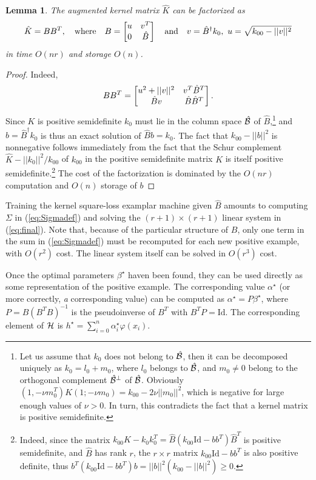 \documentclass[12pt,letterpaper]{article}
\newtheorem{lemma}{Lemma}
\begin{document}
\begin{lemma}
The augmented kernel matrix $\hat{K}$ can be factorized as
\begin{equation}
\hat{K}=BB^T,\quad\text{where}\quad
B=\left[\begin{matrix}u & v^T\\0 & \hat{B}\end{matrix}\right]\quad\text{and}\quad
v=\hat{B}^\dagger k_0,\,\, u=\sqrt{k_{00}-||v||^2}
\end{equation}
in time $O(nr)$ and storage $O(n)$.
\end{lemma}
\begin{proof}
Indeed,
\begin{equation}
BB^T=\left[\begin{matrix}u^2+||v||^2 & v^T\hat{B}^T\\ \hat{B}v & \hat{B}\hat{B}^T\end{matrix}\right].
\end{equation}
Since $K$ is positive semidefinite $k_0$ must lie in the column space
$\cal \hat{B}$ of $\hat{B}$,\footnote{Let
us assume that $k_0$ does not belong to $\cal \hat{B}$, then it can be
decomposed uniquely as $k_0=l_0+m_0$, where $l_0$ belongs to $\cal \hat{B}$,
and $m_0\neq 0$ belong to the orthogonal complement $\cal \hat{B}^\perp$ of
$\cal \hat{B}$. Obviously $(1,-\nu m_0^T)K(1;-\nu m_0)=k_{00}-2\nu||m_0||^2$, which
is negative for large enough values of $\nu>0$. In turn, this contradicts the
fact that a kernel matrix is positive semidefinite.}
and $b=\hat{B}^\dagger k_0$ is thus an exact solution of
$\hat{B}b=k_0$.
The fact that $k_{00}-||b||^2$ is nonnegative follows immediately from
the fact that the Schur complement $\hat{K}-||k_0||^2/k_{00}$ of $k_{00}$ in
the positive semidefinite matrix $K$ is itself positive semidefinite.\footnote{Indeed,
since the matrix $k_{00}K-k_0k_0^T=\hat{B}(k_{00}\text{Id}-bb^T)\hat{B}^T$ is
positive semidefinite, and $\hat{B}$ has rank $r$, the $r\times r$ matrix
$k_{00}\text{Id}-bb^T$
is also positive definite, thus
$b^T(k_{00}\text{Id}-bb^T)b=||b||^2(k_{00}-||b||^2)\ge 0$.} The
cost of the factorization is dominated by the $O(nr)$ computation and $O(n)$ storage
of $b$
\end{proof}
 
Training the kernel square-loss examplar machine given $\hat{B}$ amounts to
computing
$\Sigma$ in (\ref{eq:Sigmadef}) and solving the $(r+1)\times (r+1)$
linear system in (\ref{eq:final}). Note that, because of the
particular structure of $B$, only one term in the sum in (\ref{eq:Sigmadef})
must be recomputed for each new positive example, with $O(r^2)$ cost.
The linear system itself can be solved in $O(r^3)$ cost.
 
Once the optimal parameters $\beta^\star$ haven been found, they can
be used directly as some representation of the positive example. The
corresponding value $\alpha^\star$ (or more correctly, {\em a}
corresponding value) can be computed as $\alpha^\star =P\beta^\star$,
where $P=B(B^TB)^{-1}$ is the pseudoinverse of $B^T$ with
$B^TP=\text{Id}$. The corresponding element of $\cal H$ is
$h^\star=\sum_{i=0}^n \alpha_i^\star\varphi(x_i)$.
 
\end{document}
